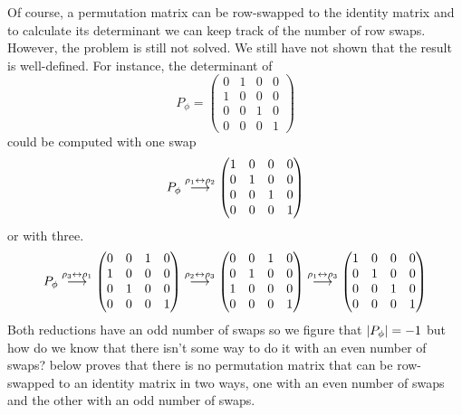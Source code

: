 Of course, a permutation matrix can be row-swapped to the identity matrix
and to calculate its determinant we can keep track of the number of row swaps.
However, the problem is still not solved.
We still have not shown that the result is well-defined.
For instance, the determinant of
\begin{equation*}
   P_{\phi}=
   \begin{pmatrix}
      0  &1  &0  &0 \\
      1  &0  &0  &0 \\
      0  &0  &1  &0 \\
      0  &0  &0  &1
   \end{pmatrix}
\end{equation*}
could be computed with one swap
\begin{equation*}
   P_{\phi}
   \mathrel{ \mathop{\longrightarrow}\limits^{\rho_1\leftrightarrow\rho_2\mathstrut}_{ \begin{subarray}{l} \relax \end{subarray}}}
   \begin{pmatrix}
      1  &0  &0  &0 \\
      0  &1  &0  &0 \\
      0  &0  &1  &0 \\
      0  &0  &0  &1
   \end{pmatrix}
\end{equation*}
or with three.
\begin{equation*}
   P_{\phi}
   \mathrel{ \mathop{\longrightarrow}\limits^{\rho_3\leftrightarrow\rho_1\mathstrut}_{ \begin{subarray}{l} \relax \end{subarray}}}
   \begin{pmatrix}
      0  &0  &1  &0 \\
      1  &0  &0  &0 \\
      0  &1  &0  &0 \\
      0  &0  &0  &1
   \end{pmatrix}
   \mathrel{ \mathop{\longrightarrow}\limits^{\rho_2\leftrightarrow\rho_3\mathstrut}_{ \begin{subarray}{l} \relax \end{subarray}}}
   \begin{pmatrix}
      0  &0  &1  &0 \\
      0  &1  &0  &0 \\
      1  &0  &0  &0 \\
      0  &0  &0  &1
   \end{pmatrix}
   \mathrel{ \mathop{\longrightarrow}\limits^{\rho_1\leftrightarrow\rho_3\mathstrut}_{ \begin{subarray}{l} \relax \end{subarray}}}
   \begin{pmatrix}
      1  &0  &0  &0 \\
      0  &1  &0  &0 \\
      0  &0  &1  &0 \\
      0  &0  &0  &1
   \end{pmatrix}
\end{equation*}
Both reductions
have an odd number of swaps so we figure that \( \deter{P_{\phi}}=-1 \)
but how do we know that there isn't some way to do it with an even number of
swaps?
 below proves 
that there is no permutation matrix
that can be row-swapped to an identity matrix in two ways, one with 
an even number of swaps and the other with an odd number of swaps.

